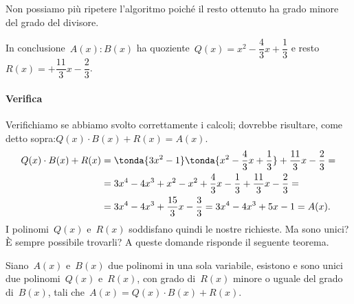 \begin{esempio}
\begin{enumerate*}
{}
 \item 
{}
 \item 
{}
\end{enumerate*}

Non possiamo più ripetere l'algoritmo poiché il resto ottenuto ha grado 
minore del grado del divisore.

In conclusione~\(A(x):B(x)\) ha 
quoziente~\(Q(x)=x^2-\dfrac{4}{3}x+\dfrac{1}{3}\) e 
resto~\(R(x)=+{\dfrac{11}{3}}x-\dfrac{2}{3}\).

\paragraph{Verifica}
Verifichiamo se abbiamo svolto correttamente i calcoli; dovrebbe risultare, 
come detto sopra:\(Q(x)\cdot B(x)+R(x) = A(x)\).
\begin{equation*}
\begin{split}
Q(x)\cdot B(x)+R(x) &= 
\tonda{3x^2-1}\tonda{x^2-\dfrac{4}{3}x+\dfrac{1}{3}}+
\dfrac{11}{3}x-\dfrac{2}{3} =\\ 
&=3x^4-4x^3+x^2-x^2+\dfrac{4}{3}x-
  \dfrac{1}{3}+\dfrac{11}{3}x-\dfrac{2}{3}=\\
&= 3x^4-4x^3+\dfrac{15}{3}x-\dfrac{3}{3}
= 3x^4-4x^3+5x-1 = A(x).
\end{split}
\end{equation*}
I polinomi~\(Q(x)\) e~\(R(x)\) soddisfano quindi le nostre richieste. 
Ma sono unici? È sempre possibile trovarli? 
A queste domande risponde il seguente teorema.
 \end{esempio}

\begin{teorema}
 Siano~\(A(x)\) e~\(B(x)\) due polinomi in una sola variabile, esistono 
 e sono  unici due polinomi~\(Q(x)\) e~\(R(x)\), con grado di~\(R(x)\)
 minore o uguale del grado di~\(B(x)\), 
 tali che~\(A(x)=Q(x)\cdot B(x)+R(x)\).
\end{teorema}

